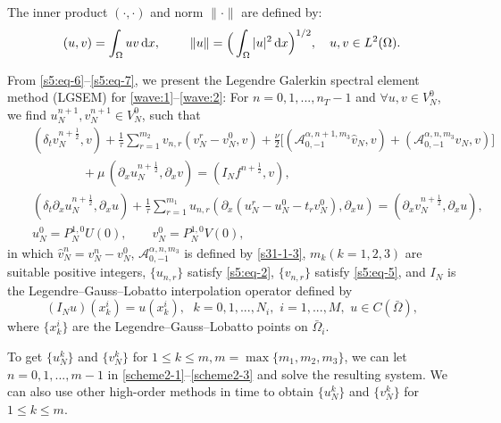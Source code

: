 \documentclass[10pt]{siamltex}
\newcommand{\px}[1][x]{\partial_{#1}}
\newcommand{\dx}[1][x]{\,{\rm d}#1}
\newcommand{\mfrac}[1][2]{\frac{1}{2}}
\begin{document}
The inner product $(\cdot,\cdot)$ and norm $\|\cdot\|$ are defined by:
\begin{equation*}
(u,v)=\int_{\Omega}{u{v}}\dx,~~~~~~~\|u\|=\Big(\int_{\Omega}|u|^2\dx\Big)^{1/2},~~~{u,v\in{L^2(\Omega)}}.
\end{equation*}

From \eqref{s5:eq-6}--\eqref{s5:eq-7}, we present the
Legendre Galerkin spectral element method (LGSEM) for
\eqref{wave:1}--\eqref{wave:2}: For $n=0,1,...,n_T-1$  and  $\forall u,v\in V_N^0$,
we find $u_N^{n+1},v_N^{n+1}\in V_N^0$,  such that
 \begin{eqnarray}
 &&(\delta_tv_N^{n+\mfrac},v) +\frac{1}{\tau}\sum_{r=1}^{m_2} v_{n,r}(v_N^r-v_N^0,v)
 +\frac{\nu}{2}\bigg[\left(\mathcal{{A}}_{0,-1}^{\alpha,n+1,m_3}\hat{v}_N,v\right)
 +\left(\mathcal{{A}}_{0,-1}^{\alpha,n,m_3}\hat{v}_N,v\right)\bigg]\nonumber\\
 &&{\quad\quad\qquad}
 +\mu\,(\px u_N^{n+\mfrac},\px v) =(I_Nf^{n+\mfrac},v),\label{scheme2-1}\\
 &&(\delta_t\px[x]u_N^{n+\frac{1}{2}},\px[x]u)
 +\frac{1}{\tau}\sum_{r=1}^{m_1} u_{n,r}(\px[x](u_N^r-u_N^0-t_rv_N^0),\px[x]u)
 = (\px v_N^{n+\frac{1}{2}},\px u),\label{scheme2-2}\\
 &&u_N^0=P_N^{1,0}U(0),\qquad v_N^0=P_N^{1,0}V(0),\label{scheme2-3}
 \end{eqnarray}
in which $\hat{v}_N^{n}=v_N^{n}-v_N^0$, $\mathcal{{A}}_{0,-1}^{\alpha,n,m_3}$
 is defined by  \eqref{s31-1-3}, $m_k(k=1,2,3)$ are suitable positive integers,
 $\{u_{n,r}\}$ satisfy \eqref{s5:eq-2},
$\{v_{n,r}\}$ satisfy \eqref{s5:eq-5},
and $I_N$ is the Legendre--Gauss--Lobatto interpolation operator defined by
$$(I_Nu)(x^i_k)=u(x^i_k),~~\,k=0,1,...,N_i,\,\,i=1,...,M,\,\,u\in C(\bar{\Omega}),$$
where $\{x_k^i\}$   are the Legendre--Gauss--Lobatto points on $\bar{\Omega}_i$.


\begin{remark}
To get  $\{u_N^k\}$ and $\{v_N^k\}$  for $1\leq k \leq m,m=\max\{m_1,m_2,m_3\}$,
we can let $n=0,1,...,m-1$ in \eqref{scheme2-1}--\eqref{scheme2-3} and solve the resulting system.
We can also use other  high-order methods in time
to obtain $\{u_N^k\}$ and $\{v_N^k\}$ for  $1\leq k \leq m$.
\end{remark}

\end{document}
